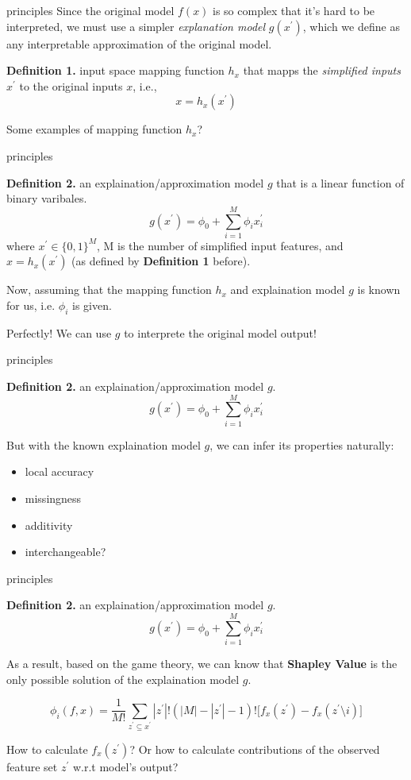 \documentclass[10pt]{beamer}
\begin{document}
\begin{frame}{principles}
  Since the original model $f(x)$ is so complex that it's hard to be interpreted, we must use a simpler \emph{explanation model} $g(x^{'})$, which we define as any interpretable approximation of the original model.

  \textbf{Definition 1.} input space mapping function $h_x$ that mapps the \textit{simplified inputs} $x^{'}$ to the original inputs $x$, i.e., $$x=h_x(x^{'})$$

  Some examples of mapping function $h_x$?

\end{frame}

\begin{frame}{principles}

  \textbf{Definition 2.} an explaination/approximation model $g$ that is a linear function of binary varibales. $$g(x^{'}) = \phi_0 + \sum_{i=1}^{M} \phi_i x_{i}^{'}$$ where $x^{'} \in \{0, 1\}^M$, M is the number of simplified input features, and $x=h_x(x^{'})$ (as defined by \textbf{Definition 1} before).

  Now, assuming that the mapping function $h_x$ and explaination model $g$ is known for us, i.e. $\phi_i$ is given.

  Perfectly! We can use $g$ to interprete the original model output!

\end{frame}

\begin{frame}{principles}

  \textbf{Definition 2.} an explaination/approximation model $g$.
  $$g(x^{'}) = \phi_0 + \sum_{i=1}^{M} \phi_i x_{i}^{'}$$

  But with the known explaination model $g$, we can infer its properties naturally:
  \begin{itemize}
    \item local accuracy
    \item missingness
    \item additivity
    \item interchangeable?
  \end{itemize}

\end{frame}

\begin{frame}{principles}

  \textbf{Definition 2.} an explaination/approximation model $g$.
  $$g(x^{'}) = \phi_0 + \sum_{i=1}^{M} \phi_i x_{i}^{'}$$

  As a result, based on the game theory, we can know that \textbf{Shapley Value} is the \alert{only possible solution} of the explaination model $g$.

  $$\phi_i(f, x)=\frac{1}{M !}\sum_{z^{'}\subseteq x^{'}} |z^{'}|!(|M|-|z^{'}|-1) !\bigl[f_x(z^{'})-f_x(z^{'}\setminus i)\bigr]$$

  How to calculate $f_x(z^{'})$? Or how to calculate contributions of the observed feature set $z^{'}$ w.r.t model's output?

\end{frame}
\end{document}
